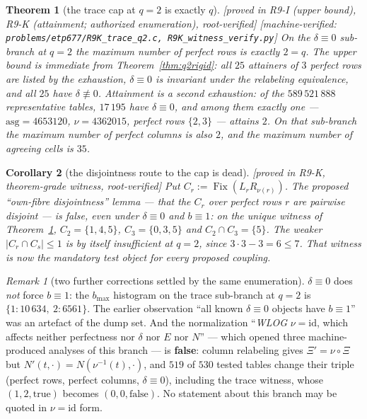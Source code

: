 \documentclass[11pt]{article}
\theoremstyle{plain}
\newtheorem{theorem}{Theorem}[section]
\newtheorem{corollary}[theorem]{Corollary}
\theoremstyle{definition}
\theoremstyle{remark}
\newtheorem*{remark*}{Remark}
\numberwithin{equation}{section}
\newcommand{\Fix}{\operatorname{Fix}}
\newcommand{\statusbox}[1]{{\small\sloppy\textsf{[#1]}}}
\newcommand{\MV}[1]{\statusbox{machine-verified: \texttt{#1}}}
\newcommand{\PROVED}[1]{\statusbox{proved in #1, root-verified}}
\begin{document}
\begin{theorem}[the trace cap at $q = 2$ is exactly $q$]\label{thm:tracecap}
\PROVED{R9-I (upper bound), R9-K (attainment; authorized enumeration)}\;%
\MV{problems\slash etp677\slash R9K\_trace\_q2.c, R9K\_witness\_verify.py}
On the $\delta\equiv0$ sub-branch at $q = 2$ the maximum number of perfect rows is
exactly $2 = q$. The upper bound is immediate from
Theorem~\ref{thm:q2rigid}: all $25$ attainers of $3$ perfect rows are listed by
the exhaustion, $\delta\equiv0$ is invariant under the relabeling equivalence, and
all $25$ have $\delta\not\equiv0$. Attainment is a second exhaustion: of the
$589\,521\,888$ representative tables, $17\,195$ have $\delta\equiv0$, and among
them exactly one --- $\mathrm{asg} = 4653120$, $\nu = 4362015$, perfect rows
$\{2,3\}$ --- attains $2$. On that sub-branch the maximum number of perfect
columns is also $2$, and the maximum number of agreeing cells is $35$.
\end{theorem}

\begin{corollary}[the disjointness route to the cap is dead]\label{cor:targetlemma}
\PROVED{R9-K, theorem-grade witness}
Put $C_r := \Fix(L_rR_{\nu(r)})$. The proposed ``own-fibre disjointness'' lemma
--- that the $C_r$ over perfect rows $r$ are pairwise disjoint --- is false, even
under $\delta\equiv0$ and $b\equiv1$: on the unique witness of
Theorem~\ref{thm:tracecap}, $C_2 = \{1,4,5\}$, $C_3 = \{0,3,5\}$ and
$C_2\cap C_3 = \{5\}$. The weaker $|C_r\cap C_s|\le1$ is by itself insufficient at
$q = 2$, since $3\cdot3-3 = 6\le7$. That witness is now the mandatory test object
for every proposed coupling.
\end{corollary}

\begin{remark*}[two further corrections settled by the same enumeration]
$\delta\equiv0$ does \emph{not} force $b\equiv1$: the $b_{\max}$ histogram on the
trace sub-branch at $q = 2$ is $\{1:10\,634,\ 2:6561\}$. The earlier observation
``all known $\delta\equiv0$ objects have $b\equiv1$'' was an artefact of the
dump set. And the normalization ``\emph{WLOG} $\nu = \mathrm{id}$, which affects
neither perfectness nor $\delta$ nor $E$ nor $N$'' --- which opened three
machine-produced analyses of this branch --- is \textbf{false}: column relabeling
gives $\Xi' = \nu\circ\Xi$ but $N'(t,\cdot) = N(\nu^{-1}(t),\cdot)$, and $519$ of
$530$ tested tables change their triple (perfect rows, perfect columns,
$\delta\equiv0$), including the trace witness, whose $(1,2,\text{true})$ becomes
$(0,0,\text{false})$. No statement about this branch may be quoted in
$\nu = \mathrm{id}$ form.
\end{remark*}
\end{document}
